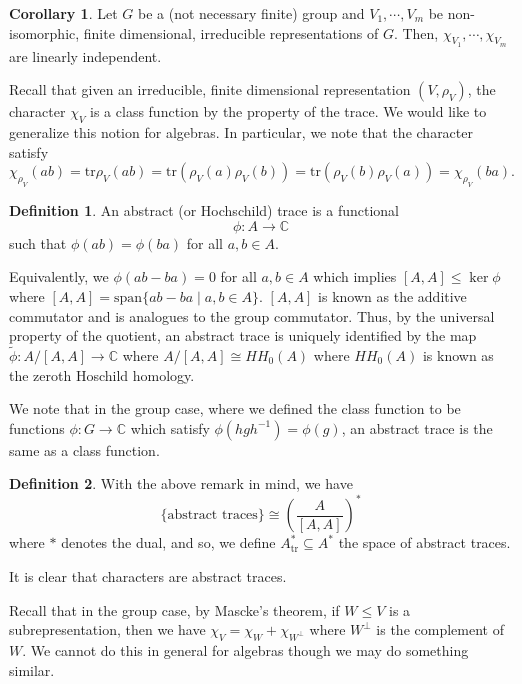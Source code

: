 \documentclass[]{article}
\theoremstyle{definition}
\newtheorem{corollary}{Corollary}[theorem]
\theoremstyle{definition}
\newtheorem{definition}{Definition}[section]
\begin{document}
\begin{corollary}
  Let \(G\) be a (not necessary finite) group and \(V_1, \cdots, V_m\) be 
  non-isomorphic, finite dimensional, irreducible representations of \(G\). Then, 
  \(\chi_{V_1}, \cdots, \chi_{V_m}\) are linearly independent.
\end{corollary}

Recall that given an irreducible, finite dimensional representation 
\((V, \rho_V)\), the character \(\chi_V\) is a class function by the property 
of the trace. We would like to generalize this notion for algebras.
In particular, we note that the character satisfy 
\[\chi_{\rho_V}(ab) = \text{tr}\rho_V(ab) = \text{tr}(\rho_V(a)\rho_V(b)) = 
  \text{tr}(\rho_V(b)\rho_V(a)) = \chi_{\rho_V}(ba).\]

\begin{definition}
  An abstract (or Hochschild) trace is a functional 
  \[\phi : A \to \mathbb{C}\]
  such that \(\phi(ab) = \phi(ba)\) for all \(a, b \in A\).
\end{definition}

Equivalently, we \(\phi(ab - ba) = 0\) for all \(a, b \in A\) which implies 
\([A, A] \le \ker \phi\) where \([A, A] = \text{span}\{ab - ba \mid a, b \in A\}\).
\([A, A]\) is known as the additive commutator and is analogues to the 
group commutator. Thus, by the universal property of the quotient, 
an abstract trace is uniquely identified by the map 
\(\tilde \phi : A / [A, A] \to \mathbb{C}\) where \(A / [A, A] \cong HH_0(A)\) 
where \(HH_0(A)\) is known as the zeroth Hoschild homology.

We note that in the group case, where we defined the class function to be 
functions \(\phi : G \to \mathbb{C}\) which satisfy \(\phi(hgh^{-1}) = \phi(g)\), 
an abstract trace is the same as a class function.

\begin{definition}
  With the above remark in mind, we have 
  \[\{\text{abstract traces}\} \cong \left(\frac{A}{[A, A]}\right)^*\]
  where \(*\) denotes the dual, and so, we define \(A_{\text{tr}}^* \subseteq A^*\) 
  the space of abstract traces. 
\end{definition}

It is clear that characters are abstract traces. 

Recall that in the group case, by Mascke's theorem, if \(W \le V\) is a 
subrepresentation, then we have \(\chi_V = \chi_W + \chi_{W^\perp}\) where 
\(W^\perp\) is the complement of \(W\). We cannot do this in general for 
algebras though we may do something similar.
\end{document}
